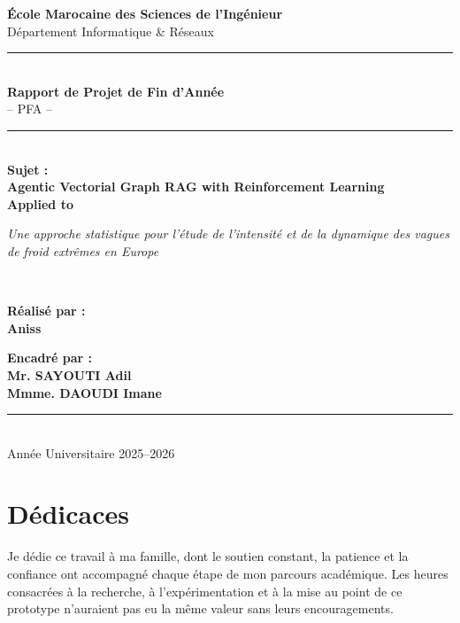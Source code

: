 \documentclass[12pt,a4paper,oneside]{report}
\newcommand{\projecttitle}{Agentic Vectorial Graph RAG with Reinforcement Learning}
\newcommand{\applicationtitle}{Une approche statistique pour l'étude de l'intensité et de la dynamique des vagues de froid extrêmes en Europe}
\begin{document}
\begin{titlepage}
\thispagestyle{empty}
\begin{center}
{\Large\textbf{École Marocaine des Sciences de l'Ingénieur}}\\[0.25cm]
{\large Département Informatique \& Réseaux}\\[1.2cm]
\rule{0.92\textwidth}{1.1pt}\\[0.7cm]
{\Large\textbf{Rapport de Projet de Fin d'Année}}\\[0.15cm]
{\large -- PFA --}\\[0.8cm]
\rule{0.92\textwidth}{0.7pt}\\[1.0cm]

{\large\textbf{Sujet :}}\\[0.45cm]
{\LARGE\bfseries\color{primary}\projecttitle}\\[0.55cm]
{\Large\bfseries Applied to}\\[0.4cm]
\begin{minipage}{0.92\textwidth}
\centering
{\Large\itshape\applicationtitle}
\end{minipage}
\\[1.5cm]

\begin{minipage}[t]{0.43\textwidth}
\centering
{\large\textbf{Réalisé par :}}\\[0.35cm]
{\Large\textbf{Aniss}}
\end{minipage}
\hfill
\begin{minipage}[t]{0.48\textwidth}
\centering
{\large\textbf{Encadré par :}}\\[0.35cm]
{\large\textbf{Mr. SAYOUTI Adil}}\\[0.2cm]
{\large\textbf{Mmme. DAOUDI Imane}}
\end{minipage}

\vfill
\rule{0.92\textwidth}{0.7pt}\\[0.4cm]
{\large Année Universitaire 2025--2026}
\end{center}
\end{titlepage}

\setcounter{page}{1}

\chapter*{Dédicaces}
Je dédie ce travail à ma famille, dont le soutien constant, la patience et la confiance ont accompagné chaque étape de mon parcours académique. Les heures consacrées à la recherche, à l'expérimentation et à la mise au point de ce prototype n'auraient pas eu la même valeur sans leurs encouragements.
\end{document}
